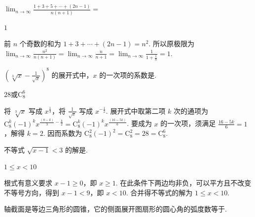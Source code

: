 \begin{problem}

\(\displaystyle\lim_{n\to \infty}\frac{1 + 3 + 5 + \cdots + (2n - 1)}{n(n + 1)} =\)\fillinblank{}
\end{problem}

\begin{answer}
\(1\)
\end{answer}

\begin{solution}
前 \(n\) 个奇数的和为 \(1+3+\cdots+(2n-1)=n^2\). 所以原极限为 \(\displaystyle\lim_{n\to\infty}\frac{n^2}{n(n+1)}=\lim_{n\to\infty}\frac{n}{n+1}=\lim_{n\to\infty}\frac{1}{1+\frac1n}=1\).
\end{solution}

\begin{problem}

\(\left( \sqrt[3]{x}-\frac{1}{\sqrt{x}} \right)^8\) 的展开式中，\(x\) 的一次项的系数是\fillinblank{}.
\end{problem}

\begin{answer}
\(28\)或\(\mathrm C_8^6\)
\end{answer}

\begin{solution}
将 \(\sqrt[3]{x}\) 写成 \(x^{\frac{1}{3}}\)，将 \(\frac1{\sqrt{x}}\) 写成 \(x^{-\frac{1}{2}}\). 展开式中取第二项 \(k\) 次的通项为 \(\mathrm C_8^k(-1)^k x^{\frac{(8-k)}{3}-\frac{k}{2}}=\mathrm C_8^k(-1)^k x^{\frac{(16-5k)}{6}}\). 要成为 \(x\) 的一次项，须满足 \(\frac{16-5k}{6}=1\)，解得 \(k=2\). 因而系数为 \(\mathrm C_8^2(-1)^2=\mathrm C_8^2=28=\mathrm C_8^6\).
\end{solution}

\begin{problem}

不等式 \(\sqrt{x - 1} < 3\) 的解是\fillinblank{}.
\end{problem}

\begin{answer}
\(1\leqslant x<10\)
\end{answer}

\begin{solution}
根式有意义要求 \(x-1\geqslant0\)，即 \(x\geqslant1\). 在此条件下两边均非负，可以平方且不改变不等号方向，得到 \(x-1<9\)，即 \(x<10\). 合并得不等式的解为 \(1\leqslant x<10\).
\end{solution}

\begin{problem}

轴截面是等边三角形的圆锥，它的侧面展开图扇形的圆心角的弧度数等于\fillinblank{}.
\end{problem}

